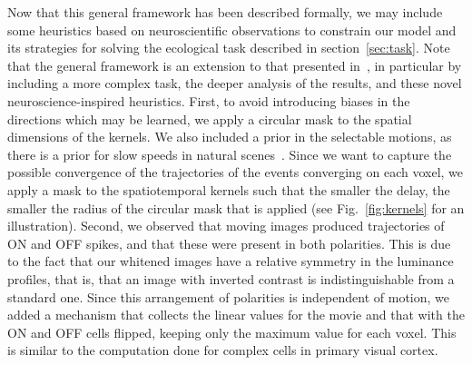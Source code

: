 \documentclass[default]{sn-jnl}%
\theoremstyle{thmstyleone}%
\theoremstyle{thmstyletwo}%
\theoremstyle{thmstylethree}%
\newcommand{\seeFig}[1]{see Fig.~\ref{fig:#1}}%
\begin{document}
Now that this general framework has been described formally, we may include some heuristics based on neuroscientific observations to constrain our model and its strategies for solving the ecological task described in section~\ref{sec:task}. Note that the general framework is an extension to that presented in~\cite{grimaldi_learning_2022}, in particular by including a more complex task, the deeper analysis of the results, and these novel neuroscience-inspired heuristics. First, to avoid introducing biases in the directions which may be learned, we apply a circular mask to the spatial dimensions of the kernels. We also included a prior in the selectable motions, as there is a prior for slow speeds in natural scenes~\citep{vacher_bayesian_2018}. Since we want to capture the possible convergence of the trajectories of the events converging on each voxel, we apply a mask to the spatiotemporal kernels such that the smaller the delay, the smaller the radius of the circular mask that is applied (\seeFig{kernels} for an illustration). %
Second, we observed that moving images produced trajectories of ON and OFF spikes, and that these were present in both polarities. This is due to the fact that our whitened images have a relative symmetry in the luminance profiles, that is, that an image with inverted contrast is indistinguishable from a standard one. Since this arrangement of polarities is independent of motion, we added a mechanism that collects the linear values for the movie and that with the ON and OFF cells flipped, keeping only the maximum value for each voxel. This is similar to the computation done for complex cells in primary visual cortex.
\end{document}
